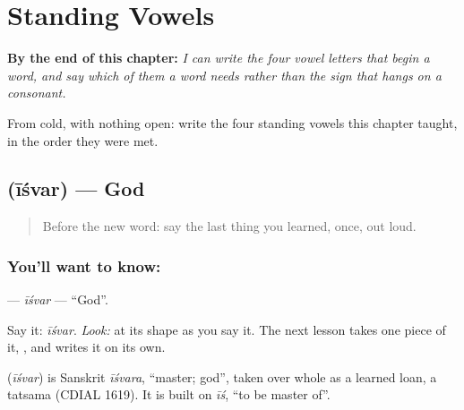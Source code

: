 
\chapter{Standing Vowels}
\label{ch:mr-ubhe-svara}

\begin{chapteropening}
\textbf{By the end of this chapter:} \emph{I can write the four vowel letters that begin a word, and say which of them a word needs rather than the sign that hangs on a consonant.}

From cold, with nothing open: write the four standing vowels this chapter taught, in the order they were met.
\end{chapteropening}

\section[\texorpdfstring{\mr{ईश्वर} (īśvar)}{ईश्वर (īśvar)}]{ (īśvar) — God}

\label{lesson:MR-C65-iishvar}



\begin{quote}
Before the new word: say the last thing you learned, once, out loud.
\end{quote}

\subsection*{You'll want to know: }
\textbf{} — \emph{īśvar} — \textquotedblleft{}God\textquotedblright{}.

Say it: \emph{īśvar}. \emph{Look:} at its shape as you say it. The next lesson takes one piece of it, \textbf{}, and writes it on its own.

\begin{cousinweb}
\textbf{} (\emph{īśvar}) is Sanskrit \emph{īśvara}, \textquotedblleft{}master; god\textquotedblright{}, taken over whole as a learned loan, a tatsama (CDIAL 1619). It is built on \emph{īś}, \textquotedblleft{}to be master of\textquotedblright{}.
\end{cousinweb}

